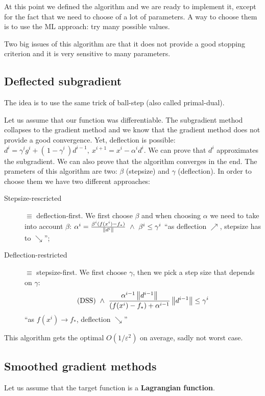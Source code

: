 \documentclass[ComputationalMathematics.tex]{subfiles}
\begin{document}
At this point we defined the algorithm and we are ready to implement it, except for the fact that we need to choose of a lot of parameters.
A way to choose them is to use the ML approach: try many possible values.

Two big issues of this algorithm are that it does not provide a good stopping criterion and it is very sensitive to many parameters.

\subsection{Deflected subgradient}

The idea is to use the same trick of ball-step (also called primal-dual).

Let us assume that our function was differentiable. The subgradient method collapses to the gradient method and we know that the gradient method does not provide a good convergence.
Yet, deflection is possible: $d^i = \gamma^i g^i  + ( \, 1 - \gamma^i \, ) d^{i-1},~x^{i+1} = x^i - \alpha^i d^i$.
We can prove that $d^i$ approximates the subgradient.
We can also prove that the algorithm converges in the end.
The prameters of this algorithm are two: $\beta$ (stepsize) and $\gamma$ (deflection).
In order to choose them we have two different approaches:
\begin{description}
  \item[{\sc Stepsize-rescricted}]$\equiv$ deflection-first. We first choose $\beta$ and when choosing $\alpha$ we need to take into account $\beta$:
    $\alpha^i = \frac{\beta^i (f(x^i) - f_*)}{\left\lVert d^i\right\rVert}~\wedge~\beta^i \leq \gamma^i$ ``as deflection $\nearrow$, stepsize has to $\searrow$'';
  \item[{\sc Deflection-restricted}] $\equiv$ stepsize-first. We first choose $\gamma$, then we pick a step size that depends on $\gamma$: 
  \[
    \text{(DSS)}~\wedge~ \frac{\alpha^{i-1} \left\lVert d^{i-1}\right\rVert}{(f(x^i) - f_*) + \alpha^{i-1}}\left\lVert d^{i-1}\right\rVert \leq \gamma^i
  \]
  ``as $f(x^i) \to f_*$, deflection $\searrow$''
\end{description}

This algorithm gets the optimal $O(1/\varepsilon^2)$ on average, sadly not worst case.

\subsection{Smoothed gradient methods}

Let us assume that the target function is a \textbf{Lagrangian function}.
\end{document}
